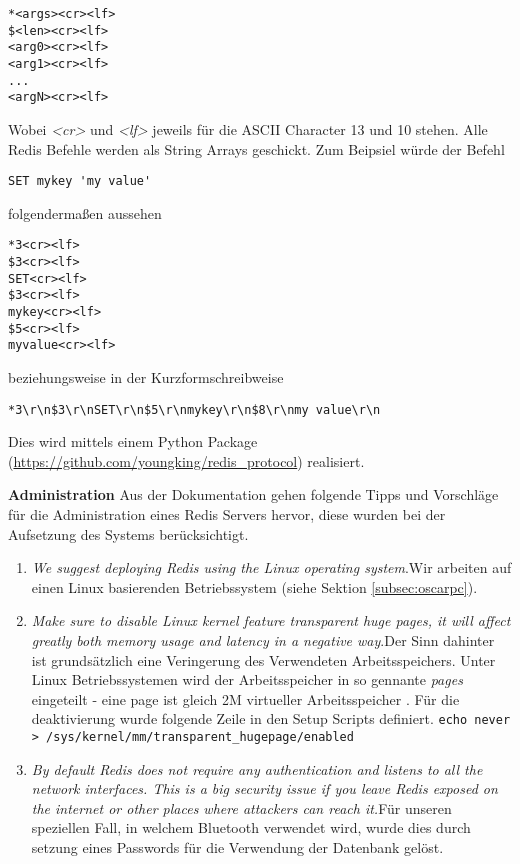 \begin{lstlisting}[caption=RESP]
*<args><cr><lf>
$<len><cr><lf>
<arg0><cr><lf>
<arg1><cr><lf>
...
<argN><cr><lf>
\end{lstlisting}

Wobei \textit{<cr>} und \textit{<lf>} jeweils für die ASCII Character 13 und 10 stehen. Alle Redis Befehle werden als String Arrays geschickt. Zum Beipsiel würde der Befehl

\tab\lstinline{SET mykey 'my value'} 

folgendermaßen aussehen

\begin{lstlisting}[caption=RESP Angewandt]
*3<cr><lf>
$3<cr><lf>
SET<cr><lf>
$3<cr><lf>
mykey<cr><lf>
$5<cr><lf>
myvalue<cr><lf>
\end{lstlisting}

beziehungsweise in der Kurzformschreibweise

\tab\lstinline{*3\r\n$3\r\nSET\r\n$5\r\nmykey\r\n$8\r\nmy value\r\n}

Dies wird mittels einem Python Package (\url{https://github.com/youngking/redis_protocol}) realisiert.

\textbf{Administration\newline}
Aus der Dokumentation \cite{MELD.CH3-redis.mainWebsite} gehen folgende Tipps und Vorschläge für die Administration eines Redis Servers hervor, diese wurden bei der Aufsetzung des Systems berücksichtigt.

\begin{enumerate}
\item \textit{We suggest deploying Redis using the Linux operating system}.\nextline Wir arbeiten auf einen Linux basierenden Betriebssystem (siehe Sektion \ref{subsec:oscarpc}).
\item \textit{Make sure to disable Linux kernel feature transparent huge pages, it will affect greatly both memory usage and latency in a negative way}.\nextline Der Sinn dahinter ist grundsätzlich eine Veringerung des Verwendeten Arbeitsspeichers. Unter Linux Betriebssystemen wird der Arbeitsspeicher in so gennante \textit{pages} eingeteilt - eine page ist gleich 2M virtueller Arbeitsspeicher \cite{MELD.CH3-redis.transhuge}. Für die deaktivierung wurde folgende Zeile in den Setup Scripts definiert. \lstinline{echo never > /sys/kernel/mm/transparent_hugepage/enabled}
\item \textit{By default Redis does not require any authentication and listens to all the network interfaces. This is a big security issue if you leave Redis exposed on the internet or other places where attackers can reach it.}\nextline Für unseren speziellen Fall, in welchem Bluetooth verwendet wird, wurde dies durch setzung eines Passwords für die Verwendung der Datenbank gelöst.
\end{enumerate}

